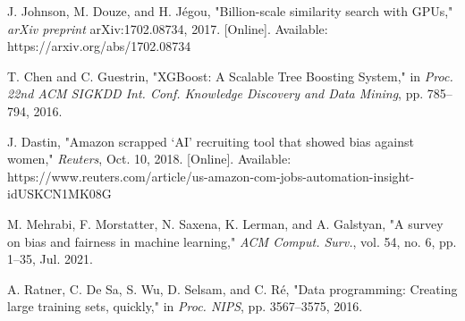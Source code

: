 \documentclass[a4paper]{article}
\begin{document}
\begin{multicols}{2}
\begin{thebibliography}{10}
     J. Johnson, M. Douze, and H. Jégou, "Billion-scale similarity search with GPUs," \textit{arXiv preprint} arXiv:1702.08734, 2017. [Online]. Available: https://arxiv.org/abs/1702.08734
    
     T. Chen and C. Guestrin, "XGBoost: A Scalable Tree Boosting System," in \textit{Proc. 22nd ACM SIGKDD Int. Conf. Knowledge Discovery and Data Mining}, pp. 785–794, 2016.
    
     J. Dastin, "Amazon scrapped ‘AI’ recruiting tool that showed bias against women," \textit{Reuters}, Oct. 10, 2018. [Online]. Available: https://www.reuters.com/article/us-amazon-com-jobs-automation-insight-idUSKCN1MK08G
    
     M. Mehrabi, F. Morstatter, N. Saxena, K. Lerman, and A. Galstyan, "A survey on bias and fairness in machine learning," \textit{ACM Comput. Surv.}, vol. 54, no. 6, pp. 1–35, Jul. 2021.
    
     A. Ratner, C. De Sa, S. Wu, D. Selsam, and C. Ré, "Data programming: Creating large training sets, quickly," in \textit{Proc. NIPS}, pp. 3567–3575, 2016.

\end{thebibliography}
    
    

\end{multicols}
\end{document}
